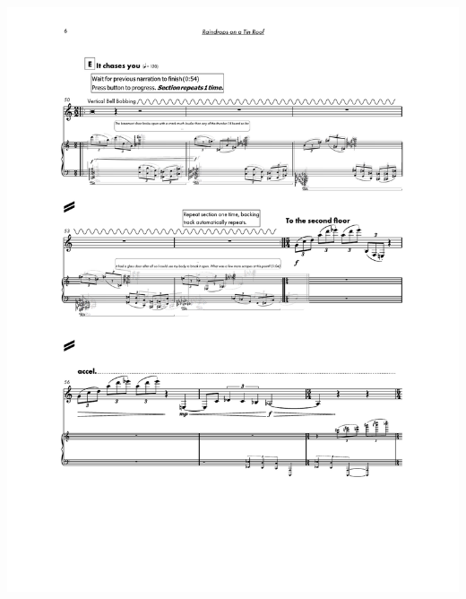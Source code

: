 \begin{center}
     \includegraphics[scale=0.75]{Scores/raindrops_Part12.pdf}
\end{center}
\newpage
